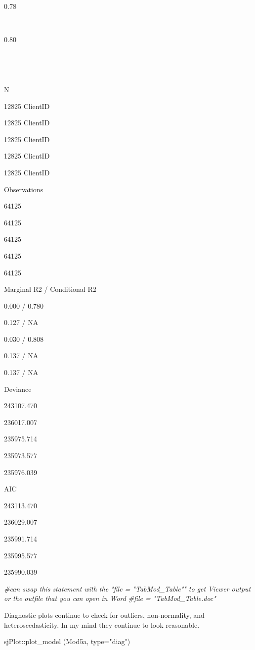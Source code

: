\documentclass[
  english,
]{book}
\newenvironment{Shaded}{\begin{snugshade}}{\end{snugshade}}
\newcommand{\AttributeTok}[1]{\textcolor[rgb]{0.77,0.63,0.00}{#1}}
\newcommand{\CommentTok}[1]{\textcolor[rgb]{0.56,0.35,0.01}{\textit{#1}}}
\newcommand{\FunctionTok}[1]{\textcolor[rgb]{0.00,0.00,0.00}{#1}}
\newcommand{\NormalTok}[1]{#1}
\newcommand{\SpecialCharTok}[1]{\textcolor[rgb]{0.00,0.00,0.00}{#1}}
\newcommand{\StringTok}[1]{\textcolor[rgb]{0.31,0.60,0.02}{#1}}
\begin{document}
0.78

~

0.80

~

~

N

12825 ClientID

12825 ClientID

12825 ClientID

12825 ClientID

12825 ClientID

Observations

64125

64125

64125

64125

64125

Marginal R2 / Conditional R2

0.000 / 0.780

0.127 / NA

0.030 / 0.808

0.137 / NA

0.137 / NA

Deviance

243107.470

236017.007

235975.714

235973.577

235976.039

AIC

243113.470

236029.007

235991.714

235995.577

235990.039

\begin{Shaded}
\begin{Highlighting}[]
\CommentTok{\#can swap this statement with the "file = "TabMod\_Table"" to get Viewer output or the outfile that you can open in Word}
\CommentTok{\#file = "TabMod\_Table.doc"}
\end{Highlighting}
\end{Shaded}

Diagnostic plots continue to check for outliers, non-normality, and heteroscedasticity. In my mind they continue to look reasonable.

\begin{Shaded}
\begin{Highlighting}[]
\NormalTok{sjPlot}\SpecialCharTok{::}\FunctionTok{plot\_model}\NormalTok{ (Mod5a, }\AttributeTok{type=}\StringTok{"diag"}\NormalTok{)}
\end{Highlighting}
\end{Shaded}
\end{document}
